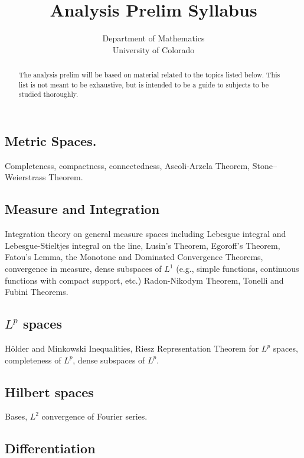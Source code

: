\documentclass[12pt]{amsart}
\title{Analysis Prelim Syllabus}
\author{Department of Mathematics\\ University of Colorado}
\begin{document}
\maketitle

\begin{abstract}
The analysis prelim will be based on material related to the topics
listed below. This list is not meant to be exhaustive, but is intended
to be a guide to subjects to be studied thoroughly.
\end{abstract}

\subsection{Metric Spaces.}

Completeness, compactness, connectedness, Ascoli-­Arzela Theorem,
Stone--Weierstrass Theorem.

\subsection{Measure and Integration}

Integration theory on general measure spaces including Lebesgue integral
and Lebesgue-­Stieltjes integral on the line, Lusin's Theorem, Egoroff's
Theorem, Fatou's Lemma, the Monotone and Dominated Convergence Theorems,
convergence in measure, dense subspaces of \(L^1\) (e.g., simple
functions, continuous functions with compact support, etc.)
Radon-­Nikodym Theorem, Tonelli and Fubini Theorems.

\subsection{\(L^p\) spaces}

Hölder and Minkowski Inequalities, Riesz Representation Theorem for
\(L^p\) spaces, completeness of \(L^p\), dense subspaces of \(L^p\).

\subsection{Hilbert spaces}

Bases, \(L^2\) convergence of Fourier series.

\subsection{Differentiation}
\end{document}
